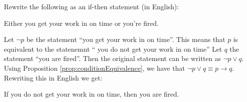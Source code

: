 \guard




\begin{exmp}
\label{exmp:conditionalStatementTranslation}
  Rewrite the following as an if-then statement (in English):
  \begin{center}
    Either you get your work in on time or you're fired.
  \end{center}

  Let $\neg p$ be the statement ``you get your work in on time''.
  This means that $p$ is equivalent to the statenemnt `` you do not get your work in on time''
  Let $q$ the statement ``you are fired''.
  Then the original statement can be written as $\neg p\vee q$.
  Using Proposition \ref{prop:conditionEquivalence}, we have that $\neg p\vee q \equiv p\rightarrow q$.
  Rewriting this in English we get:
  \begin{center}
    If you do not get your work in on time, then you are fired.
  \end{center}
\end{exmp}
